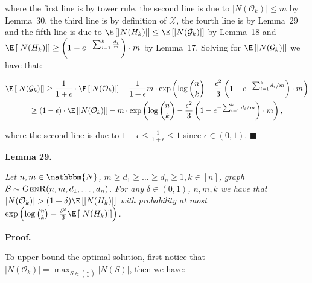 \documentclass[10pt,a4paper]{article}
\begin{document}
where the first line is by tower rule, the second line is due to $|N(\mathcal{O}_{k})|\leq m$ by Lemma 30, the third line is by definition of $\mathcal{X}$, the fourth line is by Lemma 29 and the fifth line is due to $\E\left[|N(H_{k})|\right]\leq\E\left[|N(\mathcal{G}_{k})|\right]$ by Lemma 18 and $\E\left[|N(H_{k})|\right]\geq\left(1-e^{-\sum_{i=1}^{k}\frac{d_{i}}{m}}\right)\cdot m$ by Lemma 17.
Solving for $\E\left[|N(\mathcal{G}_{k})|\right]$ we have that:\par


\[\begin{gathered}
\displaystyle\E\left[|N(\mathcal{G}_{k})|\right] \displaystyle\geq\frac{1}{1+\epsilon}\cdot\E\left[|N(\mathcal{O}_{k})|\right]-\frac{1}{1+\epsilon}m\cdot\exp\left(\log{\binom{n}{k}}-\frac{\epsilon^{2}}{3}\left(1-e^{-\sum_{i=1}^{k}d_{i}/m}\right)\cdot m\right) \\
\displaystyle\geq(1-\epsilon)\cdot\E\left[|N(\mathcal{O}_{k})|\right]-m\cdot\exp\left(\log{\binom{n}{k}}-\frac{\epsilon^{2}}{3}\left(1-e^{-\sum_{i=1}^{k}d_{i}/m}\right)\cdot m\right),
\end{gathered}\]


where the second line is due to $1-\epsilon\leq\frac{1}{1+\epsilon}\leq 1$ since $\epsilon\in(0,1)$.
\ensuremath{\blacksquare}\par






\par\medskip\noindent\textbf{\textbf{Lemma 29}\textbf{.}}\par



\emph{Let $n,m\in\mathbbm{N}$, $m\geq d_{1}\geq\dots\geq d_{n}\geq 1,k\in[n]$, graph $\mathcal{B}\sim\textsc{GenR}(n,m,d_{1},\dots,d_{n})$.
For any $\delta\in(0,1)$, $n,m,k$ we have that $|N(\mathcal{O}_{k})|>(1+\delta)\E\left[|N(H_{k})|\right]$ with probability at most $\exp\left(\log{\binom{n}{k}}-\frac{\delta^{2}}{3}\E\left[|N(H_{k})|\right]\right)$.}\par






\par\medskip\noindent\textbf{Proof.}\par



To upper bound the optimal solution, first notice that $|N(\mathcal{O}_{k})|=\max_{S\in\binom{L}{k}}|N(S)|$, then we have:\par
\end{document}

